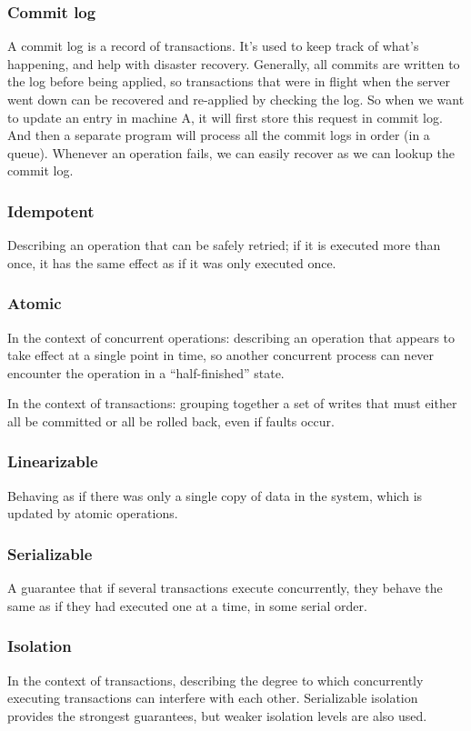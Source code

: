 \documentclass{article}
\begin{document}
    \subsubsection{Commit log}
    A commit log is a record of transactions. It's used to keep track of what's happening, and help with disaster recovery. Generally, all commits are written to the log before being applied, so transactions that were in flight when the server went down can be recovered and re-applied by checking the log. So when we want to update an entry in machine A, it will first store this request in commit log. And then a separate program will process all the commit logs in order (in a queue). Whenever an operation fails, we can easily recover as we can lookup the commit log.


    \subsubsection{Idempotent}
    Describing an operation that can be safely retried; if it is executed more than once, it has the same effect as if it was only executed once.
    
    \subsubsection{Atomic}
    In the context of concurrent operations: describing an operation that appears to take effect at a single point in time, so another concurrent process can never encounter the operation in a ``half-finished” state.
    
    In the context of transactions: grouping together a set of writes that must either all be committed or all be rolled back, even if faults occur.
    
    \subsubsection{Linearizable}
    Behaving as if there was only a single copy of data in the system, which is updated by atomic operations.
    
    \subsubsection{Serializable}
    A guarantee that if several transactions execute concurrently, they behave the same as if they had executed one at a time, in some serial order.
    
    
    \subsubsection{Isolation}
    In the context of transactions, describing the degree to which concurrently executing transactions can interfere with each other. Serializable isolation provides the strongest guarantees, but weaker isolation levels are also used.
    
\end{document}
